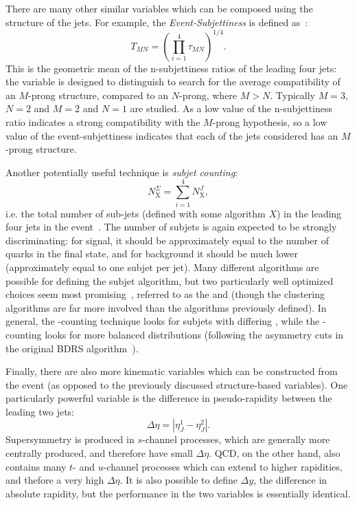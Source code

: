 There are many other similar variables which can be composed using the structure of the \largeR jets. For example, the \textit{Event-Subjettiness} is defined as~\cite{Cohen:2012yc}:
%
\begin{equation}
T_{MN} = \left(\prod_{i=1}^4 \tau_{MN}\right)^{1/4}.
\end{equation}
%
This is the geometric mean of the n-subjettiness ratios of the leading four jets: the variable is designed to distinguish to search for the average compatibility of an $M$-prong structure, compared to an $N$-prong, where $M>N$. Typically $M=3$, $N=2$ and $M=2$ and $N=1$ are studied. As a low value of the n-subjettiness ratio indicates a strong compatibility with the $M$-prong hypothesis, so a low value of the event-subjettiness indicates that each of the jets considered has an $M$-prong structure.

Another potentially useful technique is \textit{subjet counting}:
%
\begin{equation}
N_\mathrm{X}^\Sigma = \sum_{i=1}^4 N_\mathrm{X}^J,
\end{equation}
%
i.e. the total number of sub-jets (defined with some algorithm $X$) in the leading four jets in the event~\cite{SubjetCounting}. The number of subjets is again expected to be strongly discriminating: for signal, it should be approximately equal to the number of quarks in the final state, and for background it should be much lower (approximately equal to one subjet per jet). Many different algorithms are possible for defining the subjet algorithm, but two particularly well optimized choices seem most promising~\cite{SubjetCounting}, referred to as the \kt and \ca (though the clustering algorithms are far more involved than the algorithms previously defined). In general, the \kt-counting technique looks for subjets with differing \pt, while the \ca-counting looks for more balanced \pt distributions (following the asymmetry cuts in the original BDRS algorithm~\cite{BDRS}). 

Finally, there are also more kinematic variables which can be constructed from the event (as opposed to the previously discussed structure-based variables). One particularly powerful variable is the difference in pseudo-rapidity between the leading two jets:
%
\begin{equation}
\Delta \eta = |\eta_J^1 - \eta_J^2|.
\end{equation}
%
Supersymmetry is produced in $s$-channel processes, which are generally more centrally produced, and therefore have small $\Delta\eta$. QCD, on the other hand, also contains many $t$- and $u$-channel processes which can extend to higher rapidities, and thefore a very high $\Delta\eta$. It is also possible to define $\Delta y$, the difference in absolute rapidity, but the performance in the two variables is essentially identical.

